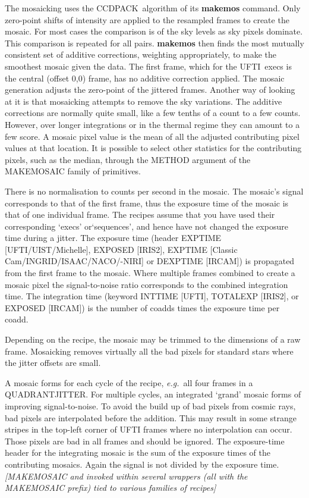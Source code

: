 \documentclass[twoside,11pt]{article}
\newcommand{\htmladdnormallink}[2]{#1}
\newcommand{\htmlref}[2]{#1}
\newcommand{\xref}[3]{#1}
\renewcommand{\_}{\texttt{\symbol{95}}}
\newcommand{\CCDPACK}{{\footnotesize CCDPACK}}
\newcommand{\UFTI}{\htmladdnormallink{UFTI}{http://www.jach.hawaii.edu/JACpublic/UKIRT/instruments/ufti/ufti.html}}
\begin{document}
The mosaicking uses the \xref{\CCDPACK\ algorithm}{sun139}{mosaicing}
of its \xref{{\bf makemos}}{sun139}{MAKEMOS} command.  Only zero-point
shifts of intensity are applied to the resampled frames to create the
mosaic.  For most cases the comparison is of the sky levels as sky
pixels dominate.  This comparison is repeated for all pairs.  {\bf
makemos} then finds the most mutually consistent set of additive
corrections, weighting appropriately, to make the smoothest mosaic
given the data. The first frame, which for the \UFTI\ execs is the
central (offset 0,0) frame, has no additive correction applied.  The
mosaic generation adjusts the zero-point of the jittered frames.
Another way of looking at it is that mosaicking attempts to remove the
sky variations.  The additive corrections are normally quite small,
like a few tenths of a count to a few counts.  However, over longer
integrations or in the thermal regime they can amount to a few score.
A mosaic pixel value is the mean of all the adjusted contributing
pixel values at that location.  It is possible to select other
statistics for the contributing pixels, such as the median, through
the METHOD argument of the \_MAKE\_MOSAIC\_ family of primitives.

There is no normalisation to counts per second in the mosaic. The
mosaic's signal corresponds to that of the first frame, thus the
exposure time of the mosaic is that of one individual frame.  The
recipes assume that you have used their corresponding `execs'
or`sequences', and hence have not changed the exposure time during a
jitter.  The exposure time (header EXP\_TIME [UFTI/UIST/Michelle],
EXPOSED [IRIS2], EXPTIME [Classic Cam/INGRID/ISAAC/NACO/-NIRI] or
DEXPTIME [IRCAM]) is propagated from the first frame to the mosaic.
Where multiple frames combined to create a mosaic pixel the
signal-to-noise ratio corresponds to the combined integration time.
The integration time (keyword INT\_TIME [UFTI], TOTALEXP [IRIS2], or
EXPOSED [IRCAM]) is the number of coadds times the exposure time per
coadd.

Depending on the recipe, the mosaic may be trimmed to the dimensions
of a raw frame.  Mosaicking removes virtually all the bad pixels for
standard stars where the jitter offsets are small.

A mosaic forms for each cycle of the recipe, {\em{e.g.}}\ all four
frames in a \htmlref{QUADRANT\_JITTER}{QUADRANT\_JITTER}.  For
multiple cycles, an integrated `grand' mosaic forms of improving
signal-to-noise.  To avoid the build up of bad pixels from cosmic
rays, bad pixels are interpolated before the addition.  This may
result in some strange stripes in the top-left corner of UFTI frames
where no interpolation can occur.  Those pixels are bad in all frames
and should be ignored. The exposure-time header for the integrating
mosaic is the sum of the exposure times of the contributing mosaics.
Again the signal is not divided by the exposure time.  \newline
{\em[\_MAKE\_MOSAIC\_ and invoked within several wrappers (all with
the \_MAKE\_MOSAIC\_ prefix) tied to various families of recipes]}
\end{document}
